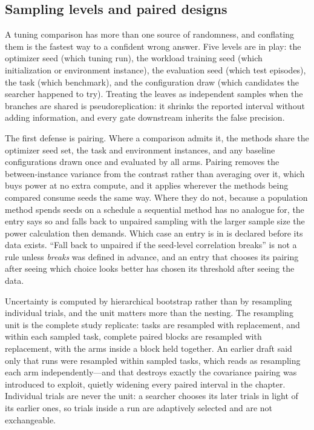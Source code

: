 \subsection{Sampling levels and paired designs}

A tuning comparison has more than one source of randomness, and
conflating them is the fastest way to a confident wrong answer. Five
levels are in play: the optimizer seed (which tuning run), the
workload training seed (which initialization or environment
instance), the evaluation seed (which test episodes), the task
(which benchmark), and the configuration draw (which candidates the
searcher happened to try). Treating the leaves as independent samples
when the branches are shared is pseudoreplication: it shrinks the
reported interval without adding information, and every gate
downstream inherits the false precision.

The first defense is pairing. Where a comparison admits it, the
methods share the optimizer seed set, the task and environment
instances, and any baseline configurations drawn once and evaluated
by all arms. Pairing removes the between-instance variance from the
contrast rather than averaging over it, which buys power at no extra
compute, and it applies wherever the methods being compared consume
seeds the same way. Where they do not, because a population method
spends seeds on a schedule a sequential method has no analogue for,
the entry says so and falls back to unpaired sampling with the larger
sample size the power calculation then demands. Which case an entry is
in is declared before its data exists. ``Fall back to unpaired if the
seed-level correlation breaks'' is not a rule unless \emph{breaks} was
defined in advance, and an entry that chooses its pairing after seeing
which choice looks better has chosen its threshold after seeing the
data.

Uncertainty is computed by hierarchical bootstrap rather than by
resampling individual trials, and the unit matters more than the
nesting. The resampling unit is the complete study replicate: tasks are
resampled with replacement, and within each sampled task, complete
paired blocks are resampled with replacement, with the arms inside a
block held together. An earlier draft said only that runs were
resampled within sampled tasks, which reads as resampling each arm
independently—and that destroys exactly the covariance pairing was
introduced to exploit, quietly widening every paired interval in the
chapter. Individual trials are never the unit: a searcher chooses its
later trials in light of its earlier ones, so trials inside a run are
adaptively selected and are not exchangeable.

